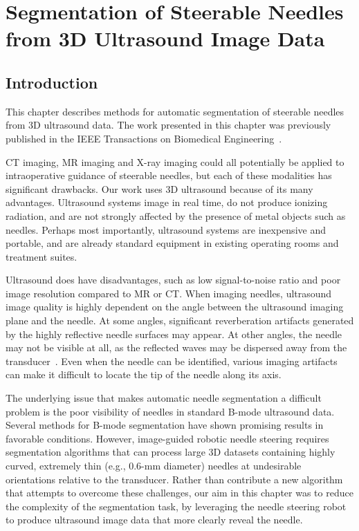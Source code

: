 \chapter[Segmentation from 3D Ultrasound]{Segmentation of Steerable Needles from 3D Ultrasound Image Data}

\section{Introduction}
This chapter describes methods for automatic segmentation of steerable needles from 3D ultrasound data. The work presented in this chapter was previously published in the IEEE Transactions on Biomedical Engineering~\cite{Adebar2014}.

CT imaging, MR imaging and X-ray imaging could all potentially be applied to intraoperative guidance of steerable needles, but each of these modalities has significant drawbacks. Our work uses 3D ultrasound because of its many advantages. Ultrasound systems image in real time, do not produce ionizing radiation, and are not strongly affected by the presence of metal objects such as needles. Perhaps most importantly, ultrasound systems are inexpensive and portable, and are already standard equipment in existing operating rooms and treatment suites.  

Ultrasound does have disadvantages, such as low signal-to-noise ratio and poor image resolution compared to MR or CT. When imaging needles, ultrasound image quality is highly dependent on the angle between the ultrasound imaging plane and the needle. At some angles, significant reverberation artifacts generated by the highly reflective needle surfaces may appear. At other angles, the needle may not be visible at all, as the reflected waves may be dispersed away from the transducer~\cite{Chung2004}. Even when the needle can be identified, various imaging artifacts can make it difficult to locate the tip of the needle along its axis. 

The underlying issue that makes automatic needle segmentation a difficult problem is the poor visibility of needles in standard B-mode ultrasound data. Several methods for B-mode segmentation have shown promising results in favorable conditions. However, image-guided robotic needle steering requires segmentation algorithms that can process large 3D datasets containing highly curved, extremely thin (e.g., 0.6-mm diameter) needles at undesirable orientations relative to the transducer. Rather than contribute a new algorithm that attempts to overcome these challenges, our aim in this chapter was to reduce the complexity of the segmentation task, by leveraging the needle steering robot to produce ultrasound image data that more clearly reveal the needle.

